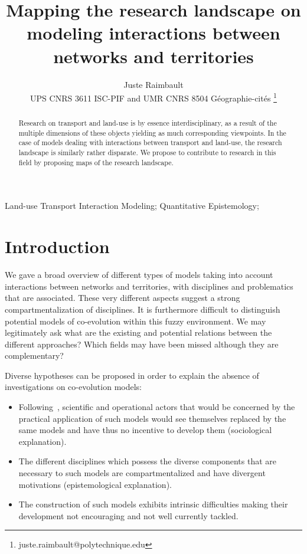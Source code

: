 \documentclass[galley]{jtlu-article-2col}
\title{Mapping the research landscape on modeling interactions between networks and territories}
\author{ Juste Raimbault  \\UPS CNRS 3611 ISC-PIF and UMR CNRS 8504 G{\'e}ographie-cit{\'e}s  \thanks{juste.raimbault@polytechnique.edu}
}%
\date{} %
\begin{document}
\maketitle
\begin{abstract}
Research on transport and land-use is by essence interdisciplinary, as a result of the multiple dimensions of these objects yielding as much corresponding viewpoints. In the case of models dealing with interactions between transport and land-use, the research landscape is similarly rather disparate. We propose to contribute to research in this field by proposing maps of the research landscape.
\end{abstract}

\begin{keywords}
  Land-use Transport Interaction Modeling; Quantitative Epistemology; 
\end{keywords}



\section{Introduction}


We gave a broad overview of different types of models taking into account interactions between networks and territories, with disciplines and problematics that are associated. These very different aspects suggest a strong compartmentalization of disciplines. It is furthermore difficult to distinguish potential models of co-evolution within this fuzzy environment. We may legitimately ask what are the existing and potential relations between the different approaches? Which fields may have been missed although they are complementary?

Diverse hypotheses can be proposed in order to explain the absence of investigations on co-evolution models:
\begin{itemize}
	\item Following~\cite{commenges:tel-00923682}, scientific and operational actors that would be concerned by the practical application of such models would see themselves replaced by the same models and have thus no incentive to develop them (sociological explanation).
	\item The different disciplines which possess the diverse components that are necessary to such models are compartmentalized and have divergent motivations (epistemological explanation).
	\item The construction of such models exhibits intrinsic difficulties making their development not encouraging and not well currently tackled.
\end{itemize}
\end{document}

